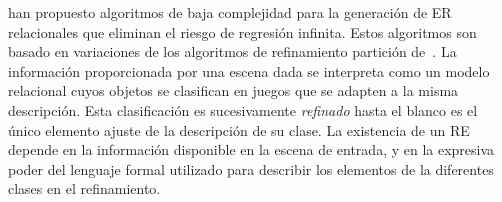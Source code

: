 


\cite{arec2:2008:Areces,arec:usin11} han propuesto algoritmos de baja complejidad
 para la generaci\'on de ER relacionales
que eliminan el riesgo de regresi\'on infinita. Estos algoritmos son
basado en variaciones de los algoritmos de refinamiento partici\'on
de~\cite{paig:thre87}. La informaci\'on proporcionada por una escena dada
se interpreta como un modelo relacional cuyos objetos se clasifican en
juegos que se adapten a la misma descripci\'on. Esta clasificaci\'on es
sucesivamente \emph{refinado} hasta el blanco es el \'unico elemento
ajuste de la descripci\'on de su clase. La existencia de un RE depende
en la informaci\'on disponible en la escena de entrada, y en la expresiva
poder del lenguaje formal utilizado para describir los elementos de la
diferentes clases en el refinamiento.


